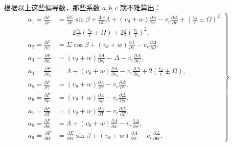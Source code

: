 根据以上这些偏导数，那些系数 $a,b,c$ 就不难算出：
\begin{equation}\label{eq:ch13_a_coeff}
\left.
\begin{aligned}
a_1 = \frac{\partial F}{\partial r} &= \frac{\partial \Sigma}{\partial r} \sin\beta + \frac{\mathrm{d}w}{\mathrm{d}r} \Lambda + (v_\theta + w) \frac{\partial \Lambda}{\partial r} - v_r \frac{\partial \Delta}{\partial r} + \left( \frac{v_\theta}{r} \pm \Omega \right)^2 \\
&\quad - 2 \frac{v_\theta}{r} \left( \frac{v_\theta}{r} \pm \Omega \right) + 2 \frac{g}{r} \left( \frac{r_0}{r} \right)^2, \\
a_2 = \frac{\partial F}{\partial \beta} &= \Sigma \cos\beta + (v_\theta + w) \frac{\partial \Lambda}{\partial \beta} - v_r \frac{\partial \Delta}{\partial \beta}, \\
a_3 = \frac{\partial F}{\partial v_r} &= (v_\theta + w) \frac{\partial \Lambda}{\partial v_r} - \Delta - v_r \frac{\partial \Delta}{\partial v_r}, \\
a_4 = \frac{\partial F}{\partial v_\theta} &= \Lambda + (v_\theta + w) \frac{\partial \Lambda}{\partial v_\theta} - v_r \frac{\partial \Delta}{\partial v_\theta} + 2 \left( \frac{v_\theta}{r} \pm \Omega \right), \\
a_5 = \frac{\partial F}{\partial \gamma} &= (v_\theta + w) \frac{\partial \Lambda}{\partial \gamma} - v_r \frac{\partial \Delta}{\partial \gamma}, \\
a_6 = \frac{\partial F}{\partial \rho} &= (v_\theta + w) \frac{\partial \Lambda}{\partial \rho} - v_r \frac{\partial \Delta}{\partial \rho}, \\
a_7 = \frac{\partial F}{\partial T} &= (v_\theta + w) \frac{\partial \Lambda}{\partial T} - v_r \frac{\partial \Delta}{\partial T}, \\
a_8 = \frac{\partial F}{\partial w} &= \Lambda + (v_\theta + w) \frac{\partial \Lambda}{\partial w} - v_r \frac{\partial \Delta}{\partial w}, \\
a_9 = \frac{\partial F}{\partial W} &= \frac{\partial \Sigma}{\partial W} \sin\beta + (v_\theta + w) \frac{\partial \Lambda}{\partial W} - v_r \frac{\partial \Delta}{\partial W}.
\end{aligned}
\right\}
\end{equation}

